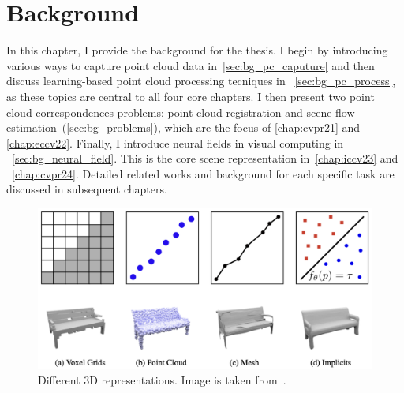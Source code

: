 \chapter{Background}
\label{chap:background}

In this chapter, I provide the background for the thesis. I begin by introducing various ways to capture point cloud data in~\cref{sec:bg_pc_caputure} and then discuss learning-based point cloud processing tecniques in ~\cref{sec:bg_pc_process}, as these topics are central to all four core chapters. I then present two point cloud correspondences problems: point cloud registration and scene flow estimation~(\cref{sec:bg_problems}), which are the focus of \cref{chap:cvpr21} and \cref{chap:eccv22}. Finally, I introduce neural fields in visual computing in ~\cref{sec:bg_neural_field}. This is the core scene representation in~\cref{chap:iccv23} and ~\cref{chap:cvpr24}. Detailed related works and background for each specific task are discussed in subsequent chapters.




\begin{figure}[t]
    \centering
    \includegraphics[width=1.0\columnwidth]{imgs/3d_representation.png}
    \caption{Different 3D representations. Image is taken from~\cite{mescheder2019occupancy}.}
    \label{fig:3d_representation}
\end{figure}

